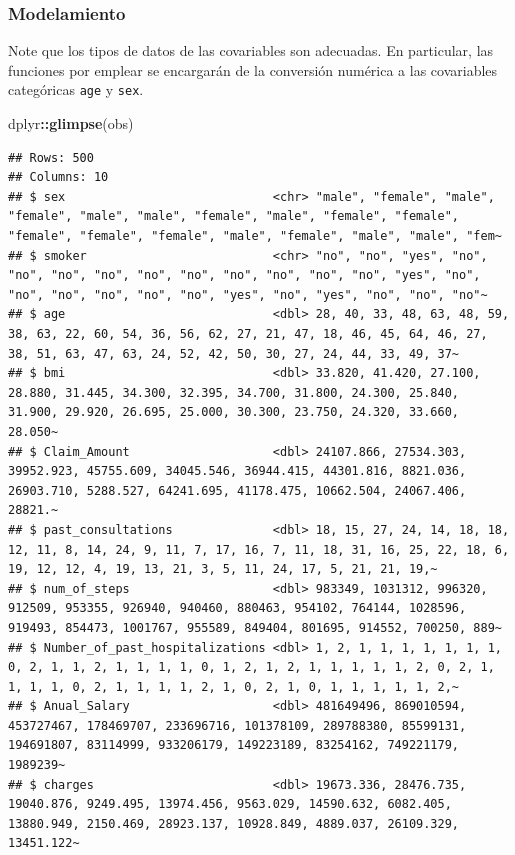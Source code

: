 \documentclass[
]{article}
\newenvironment{Shaded}{\begin{snugshade}}{\end{snugshade}}
\newcommand{\FunctionTok}[1]{\textcolor[rgb]{0.13,0.29,0.53}{\textbf{#1}}}
\newcommand{\NormalTok}[1]{#1}
\newcommand{\SpecialCharTok}[1]{\textcolor[rgb]{0.81,0.36,0.00}{\textbf{#1}}}
\begin{document}
\subsubsection{Modelamiento}\label{modelamiento}

Note que los tipos de datos de las covariables son adecuadas. En
particular, las funciones por emplear se encargarán de la conversión
numérica a las covariables categóricas \texttt{age} y \texttt{sex}.

\begin{Shaded}
\begin{Highlighting}[]
\NormalTok{dplyr}\SpecialCharTok{::}\FunctionTok{glimpse}\NormalTok{(obs)}
\end{Highlighting}
\end{Shaded}

\begin{verbatim}
## Rows: 500
## Columns: 10
## $ sex                             <chr> "male", "female", "male", "female", "male", "male", "female", "male", "female", "female", "female", "female", "female", "male", "female", "male", "male", "fem~
## $ smoker                          <chr> "no", "no", "yes", "no", "no", "no", "no", "no", "no", "no", "no", "no", "no", "yes", "no", "no", "no", "no", "no", "no", "yes", "no", "yes", "no", "no", "no"~
## $ age                             <dbl> 28, 40, 33, 48, 63, 48, 59, 38, 63, 22, 60, 54, 36, 56, 62, 27, 21, 47, 18, 46, 45, 64, 46, 27, 38, 51, 63, 47, 63, 24, 52, 42, 50, 30, 27, 24, 44, 33, 49, 37~
## $ bmi                             <dbl> 33.820, 41.420, 27.100, 28.880, 31.445, 34.300, 32.395, 34.700, 31.800, 24.300, 25.840, 31.900, 29.920, 26.695, 25.000, 30.300, 23.750, 24.320, 33.660, 28.050~
## $ Claim_Amount                    <dbl> 24107.866, 27534.303, 39952.923, 45755.609, 34045.546, 36944.415, 44301.816, 8821.036, 26903.710, 5288.527, 64241.695, 41178.475, 10662.504, 24067.406, 28821.~
## $ past_consultations              <dbl> 18, 15, 27, 24, 14, 18, 18, 12, 11, 8, 14, 24, 9, 11, 7, 17, 16, 7, 11, 18, 31, 16, 25, 22, 18, 6, 19, 12, 12, 4, 19, 13, 21, 3, 5, 11, 24, 17, 5, 21, 21, 19,~
## $ num_of_steps                    <dbl> 983349, 1031312, 996320, 912509, 953355, 926940, 940460, 880463, 954102, 764144, 1028596, 919493, 854473, 1001767, 955589, 849404, 801695, 914552, 700250, 889~
## $ Number_of_past_hospitalizations <dbl> 1, 2, 1, 1, 1, 1, 1, 1, 1, 0, 2, 1, 1, 2, 1, 1, 1, 1, 0, 1, 2, 1, 2, 1, 1, 1, 1, 1, 2, 0, 2, 1, 1, 1, 1, 0, 2, 1, 1, 1, 1, 2, 1, 0, 2, 1, 0, 1, 1, 1, 1, 1, 2,~
## $ Anual_Salary                    <dbl> 481649496, 869010594, 453727467, 178469707, 233696716, 101378109, 289788380, 85599131, 194691807, 83114999, 933206179, 149223189, 83254162, 749221179, 1989239~
## $ charges                         <dbl> 19673.336, 28476.735, 19040.876, 9249.495, 13974.456, 9563.029, 14590.632, 6082.405, 13880.949, 2150.469, 28923.137, 10928.849, 4889.037, 26109.329, 13451.122~
\end{verbatim}
\end{document}
